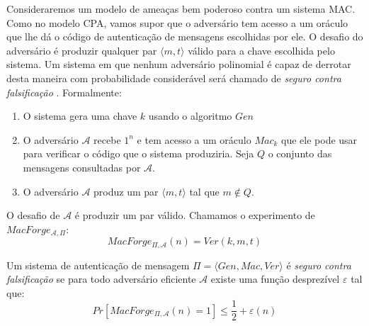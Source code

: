 Consideraremos um modelo de ameaças bem poderoso contra um sistema MAC.
Como no modelo CPA, vamos supor que o adversário tem acesso a um oráculo que lhe dá o código de autenticação de mensagens escolhidas por ele.
O desafio do adversário é produzir qualquer par $\langle m, t \rangle$ válido para a chave escolhida pelo sistema.
Um sistema em que nenhum adversário polinomial é capaz de derrotar desta maneira com probabilidade considerável será chamado de {\em seguro contra falsificação} \cite{Bellare00}.
Formalmente:
\begin{enumerate}
\item O sistema gera uma chave $k$ usando o algoritmo $Gen$
\item O adversário $\mathcal{A}$ recebe $1^n$ e tem acesso a um oráculo $Mac_k$ que ele pode usar para verificar o código que o sistema produziria. Seja $Q$ o conjunto das mensagens consultadas por $\mathcal{A}$.
\item O adversário $\mathcal{A}$ produz um par $\langle m, t \rangle$ tal que $m \notin Q$.
\end{enumerate}

\begin{center}
\end{center}

O desafio de $\mathcal{A}$ é produzir um par válido.
Chamamos o experimento de $MacForge_{\mathcal{A}, \Pi}$:
\begin{displaymath}
  MacForge_{\Pi, \mathcal{A}}(n) = Ver(k, m, t)
\end{displaymath}

Um sistema de autenticação de mensagem $\Pi = \langle Gen, Mac, Ver \rangle$ é {\em seguro contra falsificação} se para todo adversário eficiente $\mathcal{A}$ existe uma função desprezível $\varepsilon$ tal que:
\begin{displaymath}
  Pr[MacForge_{\Pi, \mathcal{A}}(n) = 1] \leq \frac{1}{2} + \varepsilon(n)
\end{displaymath}

